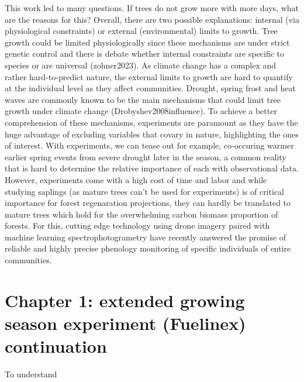 \documentclass{article}
\begin{document}
This work led to many questions. If trees do not grow more with more days, what are the reasons for this? Overall, there are two possible explanations: internal (via physiological constraints) or external (environmental) limits to growth. Tree growth could be limited physiologically since these mechanisms are under strict genetic control and there is debate whether internal constraints are specific to species or are universal (zohner2023). As climate change has a complex and rather hard-to-predict nature, the external limits to growth are hard to quantify at the individual level as they affect communities. Drought, spring frost and heat waves are commonly known to be the main mechanisms that could limit tree growth under climate change (Drobyshev2008influence). To achieve a better comprehension of these mechanisms, experiments are paramount as they have the huge advantage of excluding variables that covary in nature, highlighting the ones of interest. With experiments, we can tease out for example, co-occuring warmer earlier spring events from severe drought later in the season, a common reality that is hard to determine the relative importance of each with observational data. However, experiments come with a high cost of time and labor and while studying saplings (as mature trees can't be used for experiments) is of critical importance for forest regenaration projections, they can hardly be translated to mature trees which hold for the overwhelming carbon biomass proportion of forests. For this, cutting edge technology using drone imagery paired with machine learning spectrophotogrametry have recently answered the promise of reliable and highly precise phenology monitoring of specific individuals of entire communities. 



\section*{Chapter 1: extended growing season experiment (Fuelinex) continuation}
To understand 

\end{document}
